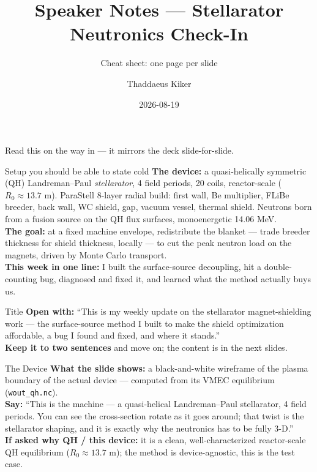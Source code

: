 \documentclass[aspectratio=169]{beamer}
\title{Speaker Notes --- Stellarator Neutronics Check-In}
\subtitle{Cheat sheet: one page per slide}
\author{Thaddaeus Kiker}
\date{2026-08-19}
\newcommand{\lab}[1]{\textcolor{acc}{\textbf{#1}}}
\begin{document}
\begin{frame}[plain]\titlepage
  \begin{center}\small Read this on the way in --- it mirrors the deck slide-for-slide.\end{center}
\end{frame}

\begin{frame}{Setup you should be able to state cold}
  \small
  \lab{The device:} a quasi-helically symmetric (QH) Landreman--Paul \emph{stellarator}, 4 field periods, 20 coils, reactor-scale ($R_0 \approx 13.7$ m). ParaStell 8-layer radial build: first wall, Be multiplier, FLiBe breeder, back wall, WC shield, gap, vacuum vessel, thermal shield. Neutrons born from a fusion source on the QH flux surfaces, monoenergetic 14.06 MeV.\\[4pt]
  \lab{The goal:} at a fixed machine envelope, redistribute the blanket --- trade breeder thickness for shield thickness, locally --- to cut the peak neutron load on the magnets, driven by Monte Carlo transport.\\[4pt]
  \lab{This week in one line:} I built the surface-source decoupling, hit a double-counting bug, diagnosed and fixed it, and learned what the method actually buys us.
\end{frame}

\begin{frame}{Title}
  \small
  \lab{Open with:} ``This is my weekly update on the stellarator magnet-shielding work --- the surface-source method I built to make the shield optimization affordable, a bug I found and fixed, and where it stands.''\\[4pt]
  \lab{Keep it to two sentences} and move on; the content is in the next slides.
\end{frame}

\begin{frame}{The Device}
  \small
  \lab{What the slide shows:} a black-and-white wireframe of the plasma boundary of the actual device --- computed from its VMEC equilibrium (\texttt{wout\_qh.nc}).\\[4pt]
  \lab{Say:} ``This is the machine --- a quasi-helical Landreman--Paul stellarator, 4 field periods. You can see the cross-section rotate as it goes around; that twist is the stellarator shaping, and it is exactly why the neutronics has to be fully 3-D.''\\[4pt]
  \lab{If asked why QH / this device:} it is a clean, well-characterized reactor-scale QH equilibrium ($R_0 \approx 13.7$ m); the method is device-agnostic, this is the test case.
\end{frame}
\end{document}
